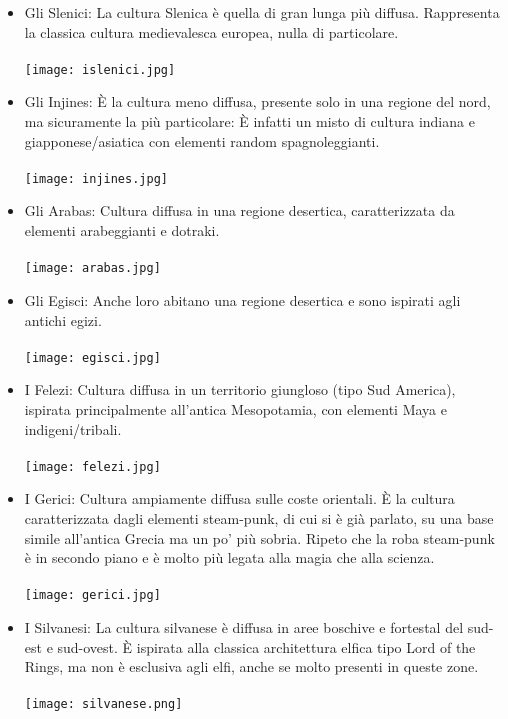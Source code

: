 \documentclass[a4paper]{report}
\begin{document}
\begin{multicols}{2}
\begin{itemize}
	\item Gli Slenici: La cultura Slenica è quella di gran lunga più diffusa. Rappresenta la classica cultura medievalesca europea, nulla di particolare.\\
	\\
	\texttt{[image: islenici.jpg]}
	\\
	
	\item Gli Injines: È la cultura meno diffusa, presente solo in una regione del nord, ma sicuramente la più particolare: È infatti un misto di cultura indiana e giapponese/asiatica con elementi random spagnoleggianti.\\
	\\
	\texttt{[image: injines.jpg]}
	\\
	
	\item Gli Arabas: Cultura diffusa in una regione desertica, caratterizzata da elementi arabeggianti e dotraki.\\
	\\
	\texttt{[image: arabas.jpg]}
	\\
	
	\item Gli Egisci: Anche loro abitano una regione desertica e sono ispirati agli antichi egizi.\\
	\\
	\texttt{[image: egisci.jpg]}
	
	\item I Felezi: Cultura diffusa in un territorio giungloso (tipo Sud America), ispirata principalmente all'antica Mesopotamia, con elementi Maya e indigeni/tribali. \\
	\\
	\texttt{[image: felezi.jpg]} 
	\\
	\newpage
	\item I Gerici: Cultura ampiamente diffusa sulle coste orientali. È la cultura caratterizzata dagli elementi steam-punk, di cui si è già parlato, su una base simile all'antica Grecia ma un po' più sobria. Ripeto che la roba steam-punk è in secondo piano e è molto più legata alla magia che alla scienza.\\
	\\
	\texttt{[image: gerici.jpg]}	
	\\

	\item I Silvanesi: La cultura silvanese è diffusa in aree boschive e fortestal del sud-est e sud-ovest. È ispirata alla classica architettura elfica tipo Lord of the Rings, ma non è esclusiva agli elfi, anche se molto presenti in queste zone.\\
	\\
	\texttt{[image: silvanese.png]}
\end{itemize}
\vspace{4cm}

\end{multicols}
\end{document}
